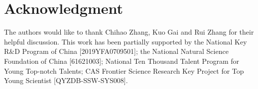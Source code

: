 \documentclass[10pt,journal,compsoc]{IEEEtran}
\begin{document}
  \section*{Acknowledgment}
\fi
The authors would like to thank Chihao Zhang, Kuo Gai and Rui Zhang for their helpful discussion. This work has been partially supported by the National Key R\&{D} Program of China [2019YFA0709501]; the National Natural Science Foundation of China [61621003]; National Ten Thousand Talent Program for Young Top-notch Talents; CAS Frontier Science Research Key Project for Top Young Scientist [QYZDB-SSW-SYS008].

\ifCLASSOPTIONcaptionsoff
  \newpage
\fi







%
\end{document}
